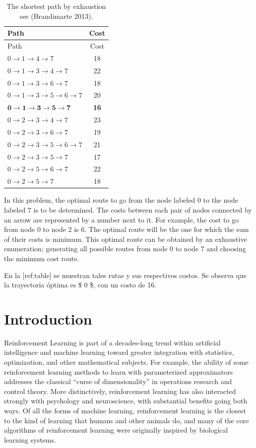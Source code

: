 \documentclass[
  letterpaper,
  DIV=11,
  numbers=noendperiod]{scrreprt}
\theoremstyle{definition}
\theoremstyle{remark}
\begin{document}
\begin{longtable}[]{@{}lc@{}}
\caption{The shortest path by exhaustion see (Brandimarte
2013).}\label{tbl-brandimarte_paths}\tabularnewline
\toprule\noalign{}
Path & Cost \\
\midrule\noalign{}
\endfirsthead
\toprule\noalign{}
Path & Cost \\
\midrule\noalign{}
\endhead
\bottomrule\noalign{}
\endlastfoot
\(0 \to 1 \to 4 \to 7\) & 18 \\
\(0 \to 1 \to 3 \to 4 \to 7\) & 22 \\
\(0 \to 1 \to 3 \to 6 \to 7\) & 18 \\
\(0 \to 1 \to 3 \to 5 \to 6 \to 7\) & 20 \\
\(\mathbf{0 \to 1 \to 3 \to 5 \to 7}\) & \textbf{16} \\
\(0 \to 2 \to 3 \to 4 \to 7\) & 23 \\
\(0 \to 2 \to 3 \to 6 \to 7\) & 19 \\
\(0 \to 2 \to 3 \to 5 \to 6 \to 7\) & 21 \\
\(0 \to 2 \to 3 \to 5 \to 7\) & 17 \\
\(0 \to 2 \to 5 \to 6 \to 7\) & 22 \\
\(0 \to 2 \to 5 \to 7\) & 18 \\
\end{longtable}

In this problem, the optimal route to go from the node labeled \(0\) to
the node labeled \(7\) is to be determined. The costs between each pair
of nodes connected by an arrow are represented by a number next to it.
For example, the cost to go from node 0 to node 2 is 6. The optimal
route will be the one for which the sum of their costs is minimum. This
optimal route can be obtained by an exhaustive enumeration; generating
all possible routes from node \(0\) to node \(7\) and choosing the
minimum cost route.

En la {[}ref:table{]} se muestran tales rutas y sus respectivos costos.
Se observa que la trayectoria óptima es \$ 0    
\$, con un costo de 16.


\chapter{Introduction}\label{introduction}

Reinforcement Learning is part of a decades-long trend within artificial
intelligence and machine learning toward greater integration with
statistics, optimization, and other mathematical subjects. For example,
the ability of some reinforcement learning methods to learn with
parameterized approximators addresses the classical ``curse of
dimensionality'' in operations research and control theory. More
distinctively, reinforcement learning has also interacted strongly with
psychology and neuroscience, with substantial benefits going both ways.
Of all the forms of machine learning, reinforcement learning is the
closest to the kind of learning that humans and other animals do, and
many of the core algorithms of reinforcement learning were originally
inspired by biological learning systems.
\end{document}
